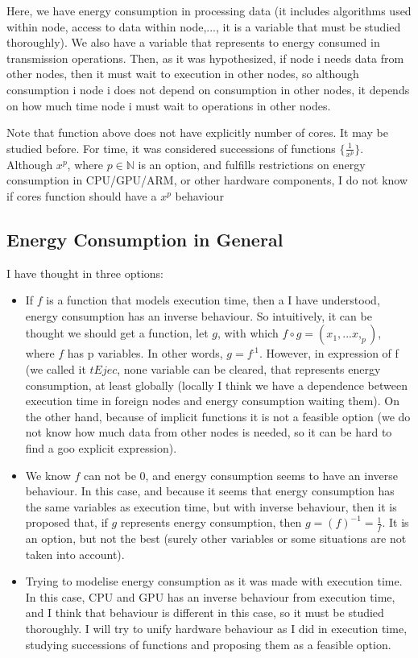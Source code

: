 \documentclass{article}
\begin{document}
Here, we have energy consumption in processing data (it includes algorithms used within node, access to data within node,..., it is a variable that must be studied thoroughly). We also have a variable that represents to energy consumed in transmission operations. Then, as it was hypothesized, if node i needs data from other nodes, then it must wait to execution in other nodes, so although consumption i node i does not depend on consumption in other nodes, it depends on how much time node i must wait to operations in other nodes.

Note that function above does not have explicitly number of cores. It may be studied before. For time, it was considered successions of functions \(\{\frac{1}{x^p}\}\). Although \(x^p\), where \(p \in \mathbb{N}\) is an option, and fulfills restrictions on energy consumption in CPU/GPU/ARM, or other hardware components, I do not know if cores function should have a \(x^p\) behaviour

\subsection{Energy Consumption in General}

I have thought in three options:
	\begin{itemize}
		\item If \(f\) is a function that models execution time, then a I have understood, energy consumption has an inverse behaviour. So intuitively, it can be thought we should get a function, let \(g\), with which \(f \circ g =(x_1,...x,_p)\), where \(f\) has p variables. In other words, \(g=f^{.1}\). However, in expression of f (we called it \(tEjec\), none variable can be cleared, that represents energy consumption, at least globally (locally I think we have a dependence between execution time in foreign nodes and energy consumption waiting them). On the other hand, because of implicit functions it is not a feasible option (we do not know how much data from other nodes is needed, so it can be hard to find a goo explicit expression).
		\item We know \(f\) can not be 0, and energy consumption seems to have an inverse behaviour. In this case, and because it seems that energy consumption has the same variables as execution time, but with inverse behaviour, then it is proposed that, if \(g\) represents energy consumption, then \(g = (f)^{-1}=\frac{1}{f}\). It is an option, but not the best (surely other variables or some situations are not taken into account).
		\item Trying to modelise energy consumption as it was made with execution time. In this case, CPU and GPU has an inverse behaviour from execution time, and I think that behaviour is different in this case, so it must be studied thoroughly. I will try to unify hardware behaviour as I did in execution time, studying successions of functions and proposing them as a feasible option.
	\end{itemize}
\end{document}

